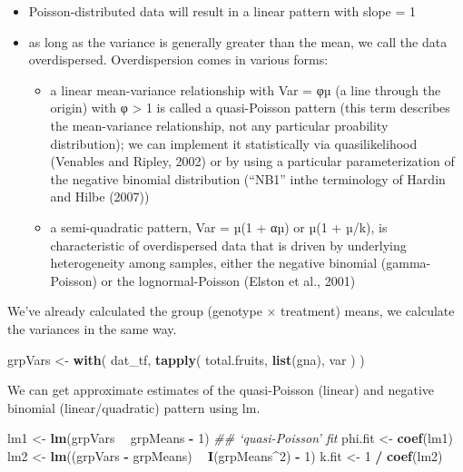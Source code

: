 \documentclass[
  12pt,
]{book}
\newenvironment{Shaded}{\begin{snugshade}}{\end{snugshade}}
\newcommand{\CommentTok}[1]{\textcolor[rgb]{0.56,0.35,0.01}{\textit{#1}}}
\newcommand{\DecValTok}[1]{\textcolor[rgb]{0.00,0.00,0.81}{#1}}
\newcommand{\KeywordTok}[1]{\textcolor[rgb]{0.13,0.29,0.53}{\textbf{#1}}}
\newcommand{\NormalTok}[1]{#1}
\newcommand{\OperatorTok}[1]{\textcolor[rgb]{0.81,0.36,0.00}{\textbf{#1}}}
\newcommand{\StringTok}[1]{\textcolor[rgb]{0.31,0.60,0.02}{#1}}
\providecommand{\tightlist}{%
  \setlength{\itemsep}{0pt}\setlength{\parskip}{0pt}}
\begin{document}
\begin{itemize}
\tightlist
\item
  Poisson-distributed data will result in a linear pattern with slope = 1
\item
  as long as the variance is generally greater than the mean, we call the data overdispersed. Overdispersion comes in various forms:

  \begin{itemize}
  \tightlist
  \item
    a linear mean-variance relationship with Var = φµ (a line through the origin) with φ \textgreater{} 1 is called a quasi-Poisson pattern (this term describes the mean-variance relationship, not any particular proability distribution); we can implement it statistically via quasilikelihood (Venables and Ripley, 2002) or by using a particular parameterization of the negative binomial distribution (``NB1'' inthe terminology of Hardin and Hilbe (2007))
  \item
    a semi-quadratic pattern, Var = µ(1 + αµ) or µ(1 + µ/k), is characteristic of overdispersed data that is driven by underlying heterogeneity among samples, either the negative binomial (gamma-Poisson) or the lognormal-Poisson (Elston et al., 2001)
  \end{itemize}
\end{itemize}

We've already calculated the group (genotype × treatment) means, we calculate the variances in the same way.

\begin{Shaded}
\begin{Highlighting}[]
\NormalTok{grpVars <-}\StringTok{ }\KeywordTok{with}\NormalTok{(}
\NormalTok{  dat_tf,}
  \KeywordTok{tapply}\NormalTok{(}
\NormalTok{    total.fruits,}
    \KeywordTok{list}\NormalTok{(gna), var}
\NormalTok{  )}
\NormalTok{)}
\end{Highlighting}
\end{Shaded}

We can get approximate estimates of the quasi-Poisson (linear) and negative binomial (linear/quadratic) pattern using lm.

\begin{Shaded}
\begin{Highlighting}[]
\NormalTok{lm1 <-}\StringTok{ }\KeywordTok{lm}\NormalTok{(grpVars }\OperatorTok{~}\StringTok{ }\NormalTok{grpMeans }\OperatorTok{-}\StringTok{ }\DecValTok{1}\NormalTok{) }\CommentTok{## `quasi-Poisson' fit}
\NormalTok{phi.fit <-}\StringTok{ }\KeywordTok{coef}\NormalTok{(lm1)}
\NormalTok{lm2 <-}\StringTok{ }\KeywordTok{lm}\NormalTok{((grpVars }\OperatorTok{-}\StringTok{ }\NormalTok{grpMeans) }\OperatorTok{~}\StringTok{ }\KeywordTok{I}\NormalTok{(grpMeans}\OperatorTok{^}\DecValTok{2}\NormalTok{) }\OperatorTok{-}\StringTok{ }\DecValTok{1}\NormalTok{)}
\NormalTok{k.fit <-}\StringTok{ }\DecValTok{1} \OperatorTok{/}\StringTok{ }\KeywordTok{coef}\NormalTok{(lm2)}
\end{Highlighting}
\end{Shaded}
\end{document}
